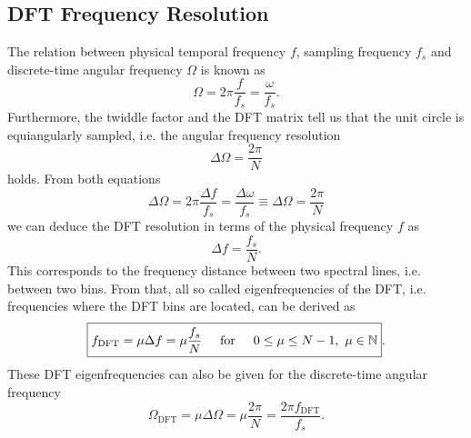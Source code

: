 \documentclass[11pt,a4paper,DIV=12]{scrartcl}
\begin{document}
\subsection{DFT Frequency Resolution}
The relation between physical temporal frequency $f$, sampling frequency $f_s$
and discrete-time angular frequency $\Omega$ is known as
\begin{equation}
\Omega=2\pi \frac{f}{f_s}=\frac{\omega}{f_s}.
\end{equation}
%
Furthermore, the twiddle factor and the DFT matrix tell us that
the unit circle is equiangularly sampled, i.e. the angular frequency
resolution
\begin{equation}
\Delta \Omega = \frac{2\pi}{N}
\end{equation}
holds.
%
From both equations
\begin{equation}
\Delta \Omega=2\pi \frac{\Delta f}{f_s}=\frac{\Delta \omega}{f_s}\equiv
\Delta \Omega = \frac{2\pi}{N}
\end{equation}
we can deduce the DFT resolution in terms of the physical frequency $f$ as
\begin{equation}
\boxed{\Delta f = \frac{f_s}{N}}.
\end{equation}
%
This corresponds to the frequency distance between two spectral lines, i.e.
between two bins.
%
From that, all so called eigenfrequencies of the DFT, i.e. frequencies where
the DFT bins are located, can be derived as
\begin{equation}
\boxed{f_\text{DFT}=\mu \Delta f=\mu\frac{f_s}{N}
\hspace{5mm}\text{for}\hspace{5mm}
0\leq \mu\leq N-1,\,\,\mu\in\mathbb{N}}.
\end{equation}
%
These DFT eigenfrequencies can also be given for the discrete-time angular
frequency
\begin{equation}
\Omega_\text{DFT} =
\mu \Delta \Omega =
\mu \frac{2\pi}{N} =
\frac{2\pi f_\text{DFT}}{f_s}.
\label{eq:OmegaDFT}
\end{equation}

\end{document}
